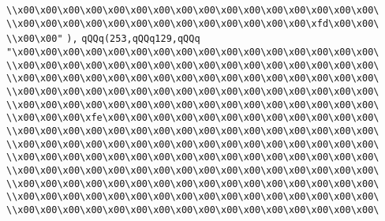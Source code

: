 \verb|\\x00\x00\x00\x00\x00\x00\x00\x00\x00\x00\x00\x00\x00\x00\x00\x00\|\newline
\verb|\\x00\x00\x00\x00\x00\x00\x00\x00\x00\x00\x00\x00\x00\xfd\x00\x00\|\newline
\verb|\\x00\x00"|\newline
\verb|),|\newline
\verb|qQQq(253,qQQq129,qQQq|\newline
\verb|"\x00\x00\x00\x00\x00\x00\x00\x00\x00\x00\x00\x00\x00\x00\x00\x00\|\newline
\verb|\\x00\x00\x00\x00\x00\x00\x00\x00\x00\x00\x00\x00\x00\x00\x00\x00\|\newline
\verb|\\x00\x00\x00\x00\x00\x00\x00\x00\x00\x00\x00\x00\x00\x00\x00\x00\|\newline
\verb|\\x00\x00\x00\x00\x00\x00\x00\x00\x00\x00\x00\x00\x00\x00\x00\x00\|\newline
\verb|\\x00\x00\x00\x00\x00\x00\x00\x00\x00\x00\x00\x00\x00\x00\x00\x00\|\newline
\verb|\\x00\x00\x00\xfe\x00\x00\x00\x00\x00\x00\x00\x00\x00\x00\x00\x00\|\newline
\verb|\\x00\x00\x00\x00\x00\x00\x00\x00\x00\x00\x00\x00\x00\x00\x00\x00\|\newline
\verb|\\x00\x00\x00\x00\x00\x00\x00\x00\x00\x00\x00\x00\x00\x00\x00\x00\|\newline
\verb|\\x00\x00\x00\x00\x00\x00\x00\x00\x00\x00\x00\x00\x00\x00\x00\x00\|\newline
\verb|\\x00\x00\x00\x00\x00\x00\x00\x00\x00\x00\x00\x00\x00\x00\x00\x00\|\newline
\verb|\\x00\x00\x00\x00\x00\x00\x00\x00\x00\x00\x00\x00\x00\x00\x00\x00\|\newline
\verb|\\x00\x00\x00\x00\x00\x00\x00\x00\x00\x00\x00\x00\x00\x00\x00\x00\|\newline
\verb|\\x00\x00\x00\x00\x00\x00\x00\x00\x00\x00\x00\x00\x00\x00\x00\x00\|\newline
